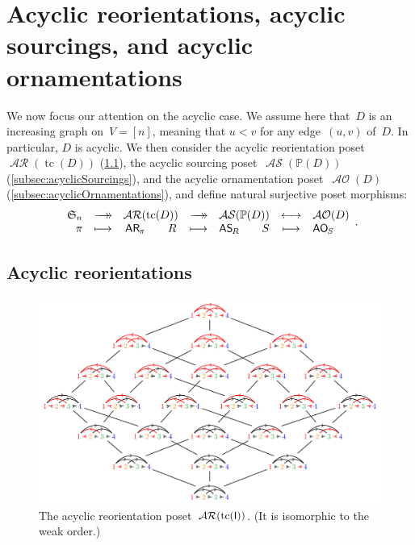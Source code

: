 \documentclass{amsart}
\theoremstyle{definition}
\renewcommand{\c}[1]{\mathcal{#1}} %
\newcommand{\surjection}{\longrightarrow\mathrel{\mkern-22mu}\rightarrow\,}
\newcommand{\bijection}{\longleftrightarrow}
\DeclareMathOperator{\tc}{tc} %
\newcommand{\fS}{\mathfrak{S}} %
\newcommand{\mymap}[2]{\mathsf{#1}_{\hspace{-.7pt}#2}}
\DeclareMathOperator{\AOrn}{\c{AO}}  %
\newcommand{\aorn}[1]{\mymap{AO}{#1}}  %
\DeclareMathOperator{\AReori}{\c{AR}}  %
\newcommand{\areori}[1]{\mymap{AR}{#1}}  %
\DeclareMathOperator{\ASour}{\mathcal{AS}}  %
\newcommand{\asour}[1]{\mymap{AS}{#1}}  %
\newcommand{\PP}{\mathbb P} %
\newcommand{\Igraph}{\sf I} %
\begin{document}
\section{Acyclic reorientations, acyclic sourcings, and acyclic ornamentations}
\label{sec:acyclic}

We now focus our attention on the acyclic case.
We assume here that~$D$ is an increasing graph on~$V = [n]$, meaning that $u < v$ for any edge~$(u,v)$ of~$D$. In particular, $D$ is acyclic.
We then consider the acyclic reorientation poset~$\AReori(\tc(D))$ (\cref{subsec:acyclicReorientations}), the acyclic sourcing poset~$\ASour(\PP(D))$ (\cref{subsec:acyclicSourcings}), and the acyclic ornamentation poset~$\AOrn(D)$ (\cref{subsec:acyclicOrnamentations}), and define natural surjective poset morphisms:
\[
\begin{array}{rcccccl}
	\fS_n & \surjection & \AReori(\tc(D)) & \surjection & \ASour(\PP(D)) & \bijection & \AOrn(D) \\
	\pi & \longmapsto & \areori{\pi} \qquad R & \longmapsto & \asour{R} \qquad S & \longmapsto & \aorn{S}
\end{array}
.
\]


\subsection{Acyclic reorientations}
\label{subsec:acyclicReorientations}

\begin{figure}[b]
	\centerline{\includegraphics[scale=.68]{acyclicReorientationsI}}
	\caption{The acyclic reorientation poset~$\AReori(\tc(\Igraph))$. (It is isomorphic to the weak order.)}
	\label{fig:acyclicReorientationsI}
\end{figure}
\end{document}

